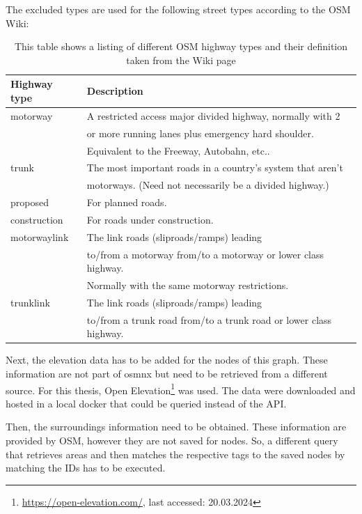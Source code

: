 The excluded types are used for the following street types according to the OSM Wiki:
\begin{table}[ht]
	\centering
	\begin{tabular}{l|l}
		Highway type & Description\\
		\hline
		motorway & A restricted access major divided highway, normally with 2\\ 
		& or more running lanes plus emergency hard shoulder.\\
		& Equivalent to the Freeway, Autobahn, etc..  \\
		trunk & The most important roads in a country's system that aren't \\
		& motorways. (Need not necessarily be a divided highway.) \\
		proposed & For planned roads. \\
		construction & For roads under construction. \\
		motorway\textunderscore link & The link roads (sliproads/ramps) leading\\
		& to/from a motorway from/to a motorway or lower class highway. \\
		& Normally with the same motorway restrictions. \\
		trunk\textunderscore link & The link roads (sliproads/ramps) leading \\
		& to/from a trunk road from/to a trunk road or lower class highway. 
	\end{tabular}
	\caption[OSM highway types]{This table shows a listing of different OSM highway types and their definition taken from the Wiki page\protect\footnotemark}
	\label{tab:osmHighwayTypes}
\end{table}


Next, the elevation data has to be added for the nodes of this graph.
These information are not part of osmnx but need to be retrieved from a different source.
For this thesis, Open Elevation\footnote{\url{https://open-elevation.com/}, last accessed: 20.03.2024} was used.
The data were downloaded and hosted in a local docker that could be queried instead of the API.

Then, the surroundings information need to be obtained. 
These information are provided by OSM, however they are not saved for nodes.
So, a different query that retrieves areas and then matches the respective tags to the saved nodes by matching the IDs has to be executed.

